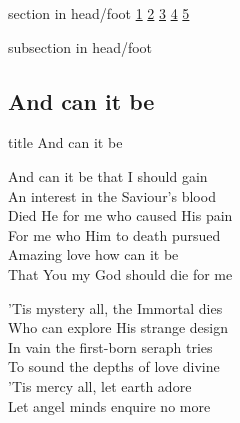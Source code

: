 \documentclass{beamer}
\begin{document}
{
{ 
 {
 \begin{beamercolorbox}[ht=4.5ex,dp=1.5ex,%
      leftskip=.3cm,rightskip=.3cm plus1fil]{section in head/foot}
 \fontsize{12}{25}\selectfont 
\hyperlink{And can it be[]1}{1}
\hyperlink{And can it be[]2}{2}
\hyperlink{And can it be[]3}{3}
\hyperlink{And can it be[]4}{4}
\hyperlink{And can it be[]5}{5}
 
 \end{beamercolorbox}%
  \begin{beamercolorbox}[ht=2.5ex,dp=1.125ex,%
   leftskip=.3cm,rightskip=.3cm plus1fil]{subsection in head/foot}
   \insertauthor
 \end{beamercolorbox}%
 }
}
\subsection{ And can it be }

\hypertarget{And can it be[]}{}
\begin{frame}{}
 \vfill
  \centering
  \begin{beamercolorbox}[sep=8pt,center,shadow=true,rounded=true]{title}
    And can it be    
  \end{beamercolorbox}
  \vfill
\end{frame}

\hypertarget{And can it be[]1}{}
\begin{frame}{}
\fontsize{ 18 }{ 23 }\selectfont

And can it be that I should gain\\ 
An interest in the Saviour's blood\\ 
Died He for me who caused His pain\\ 
For me who Him to death pursued\\ 
Amazing love how can it be\\ 
That You my God should die for me 

\end{frame}

\hypertarget{And can it be[]2}{}
\begin{frame}{}
\fontsize{ 18 }{ 23 }\selectfont

'Tis mystery all, the Immortal dies\\ 
Who can explore His strange design\\ 
In vain the first-born seraph tries\\ 
To sound the depths of love divine\\ 
'Tis mercy all, let earth adore\\ 
Let angel minds enquire no more 


\end{frame}}
\end{document}
